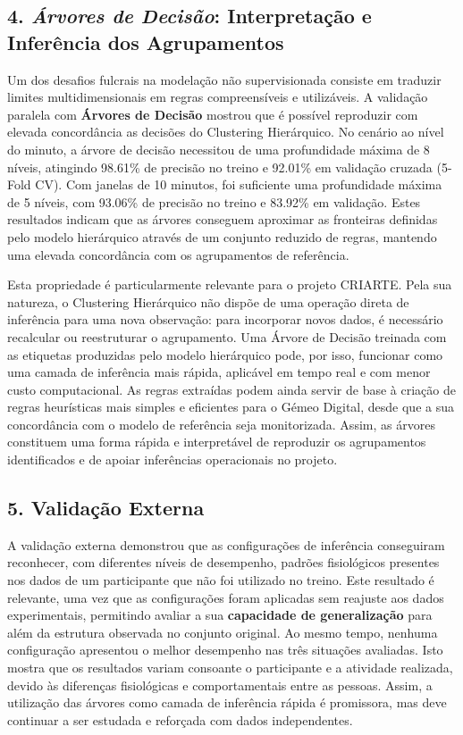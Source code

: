 \subsection*{4. \textit{Árvores de Decisão}: Interpretação e Inferência dos Agrupamentos}

Um dos desafios fulcrais na modelação não supervisionada consiste em traduzir limites multidimensionais em regras compreensíveis e utilizáveis. A validação paralela com \textbf{Árvores de Decisão} mostrou que é possível reproduzir com elevada concordância as decisões do Clustering Hierárquico. No cenário ao nível do minuto, a árvore de decisão necessitou de uma profundidade máxima de 8 níveis, atingindo 98.61\% de precisão no treino e 92.01\% em validação cruzada (5-Fold CV). Com janelas de 10 minutos, foi suficiente uma profundidade máxima de 5 níveis, com 93.06\% de precisão no treino e 83.92\% em validação. Estes resultados indicam que as árvores conseguem aproximar as fronteiras definidas pelo modelo hierárquico através de um conjunto reduzido de regras, mantendo uma elevada concordância com os agrupamentos de referência.

Esta propriedade é particularmente relevante para o projeto CRIARTE. Pela sua natureza, o Clustering Hierárquico não dispõe de uma operação direta de inferência para uma nova observação: para incorporar novos dados, é necessário recalcular ou reestruturar o agrupamento. Uma Árvore de Decisão treinada com as etiquetas produzidas pelo modelo hierárquico pode, por isso, funcionar como uma camada de inferência mais rápida, aplicável em tempo real e com menor custo computacional. As regras extraídas podem ainda servir de base à criação de regras heurísticas mais simples e eficientes para o Gémeo Digital, desde que a sua concordância com o modelo de referência seja monitorizada. Assim, as árvores constituem uma forma rápida e interpretável de reproduzir os agrupamentos identificados e de apoiar inferências operacionais no projeto.

\subsection*{5. Validação Externa}

A validação externa demonstrou que as configurações de inferência conseguiram reconhecer, com diferentes níveis de desempenho, padrões fisiológicos presentes nos dados de um participante que não foi utilizado no treino. Este resultado é relevante, uma vez que as configurações foram aplicadas sem reajuste aos dados experimentais, permitindo avaliar a sua \textbf{capacidade de generalização} para além da estrutura observada no conjunto original. Ao mesmo tempo, nenhuma configuração apresentou o melhor desempenho nas três situações avaliadas. Isto mostra que os resultados variam consoante o participante e a atividade realizada, devido às diferenças fisiológicas e comportamentais entre as pessoas. Assim, a utilização das árvores como camada de inferência rápida é promissora, mas deve continuar a ser estudada e reforçada com dados independentes.

